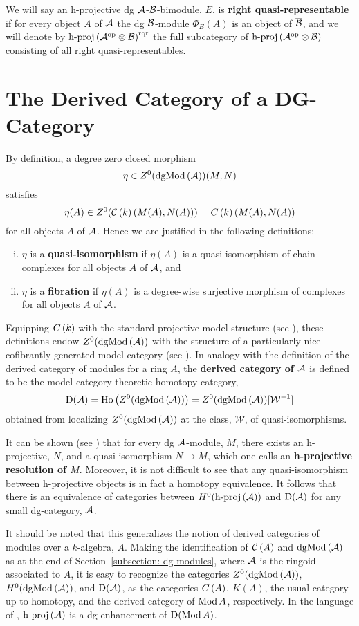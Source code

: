 We will say an h-projective dg \(\mathcal{A}\)-\(\mathcal{B}\)-bimodule, \(E\), is \textbf{right quasi-representable} if for every object \(A\) of \(\mathcal{A}\) the dg \(\mathcal{B}\)-module \(\Phi_E(A)\) is an object of \(\overline{\mathcal{B}}\), and we will denote by \(\operatorname{h-proj}\left(\mathcal{A}^{\operatorname{op}} \otimes \mathcal{B}\right)^{\operatorname{rqr}}\) the full subcategory of \(\operatorname{h-proj}\left(\mathcal{A}^{\operatorname{op}} \otimes \mathcal{B}\right)\) consisting of all right quasi-representables.

\section{The Derived Category of a DG-Category}
By definition, a degree zero closed morphism
\[\eta \in Z^0(\operatorname{dgMod}\left(\mathcal{A}\right))(M,N)\]
satisfies
\[\eta(A) \in Z^0(\mathcal{C}\left(k\right)(M(A), N(A))) = C\left(k\right)(M(A), N(A))\]
for all objects \(A\) of \(\mathcal{A}\).
Hence we are justified in the following definitions:
\begin{enumerate}[(i)]
\item
  \(\eta\) is a \textbf{quasi-isomorphism} if \(\eta(A)\) is a quasi-isomorphism of chain complexes for all objects \(A\) of \(\mathcal{A}\), and
\item
  \(\eta\) is a \textbf{fibration} if \(\eta(A)\) is a degree-wise surjective morphism of complexes for all objects \(A\) of \(\mathcal{A}\).
\end{enumerate}
Equipping \(C\left(k\right)\) with the standard projective model structure (see \cite[Section 2.3]{Hovey99}), these definitions endow \(Z^0(\operatorname{dgMod}\left(\mathcal{A}\right))\) with the structure of a particularly nice cofibrantly generated model category (see \cite[Section 3]{Toen07}).
In analogy with the definition of the derived category of modules for a ring \(A\), the \textbf{derived category of \(\mathcal{A}\)} is defined to be the model category theoretic homotopy category,
\[\mathrm{D}(\mathcal{A}) = \operatorname{Ho}\left(Z^0(\operatorname{dgMod}\left(\mathcal{A}\right))\right) = Z^0(\operatorname{dgMod}\left(\mathcal{A}\right))[\mathcal{W}^{-1}]\]
obtained from localizing \(Z^0(\operatorname{dgMod}\left(\mathcal{A}\right))\) at the class, \(\mathcal{W}\), of quasi-isomorphisms.

It can be shown (see \cite[Section 3.5]{Keller95}) that for every dg \(\mathcal{A}\)-module, \(M\), there exists an h-projective, \(N\), and a quasi-isomorphism \(N \to M\), which one calls an \textbf{h-projective resolution of \(M\)}.
Moreover, it is not difficult to see that any quasi-isomorphism between h-projective objects is in fact a homotopy equivalence.
It follows that there is an equivalence of categories between \(H^0(\operatorname{h-proj}\left(\mathcal{A}\right))\) and \(\mathrm{D}(\mathcal{A})\) for any small dg-category, \(\mathcal{A}\).

It should be noted that this generalizes the notion of derived categories of modules over a $k$-algebra, $A$.
Making the identification of $\mathcal{C}\left(A\right)$ and $\operatorname{dgMod}\left(\mathcal{A}\right)$ as at the end of Section~\ref{subsection: dg modules}, where $\mathcal{A}$ is the ringoid associated to $A$, it is easy to recognize the categories \(Z^0(\operatorname{dgMod}\left(\mathcal{A}\right))\), \(H^0(\operatorname{dgMod}\left(\mathcal{A}\right))\), and \(\mathrm{D}(\mathcal{A})\), as the categories \(C\left(A\right)\), \(K(A)\), the usual category up to homotopy, and the derived category of \(\operatorname{Mod}A\), respectively.
In the language of \cite{Lunts-Orlov}, \(\operatorname{h-proj}\left(\mathcal{A}\right)\) is a dg-enhancement of \(\mathrm{D}(\operatorname{Mod}A)\).


